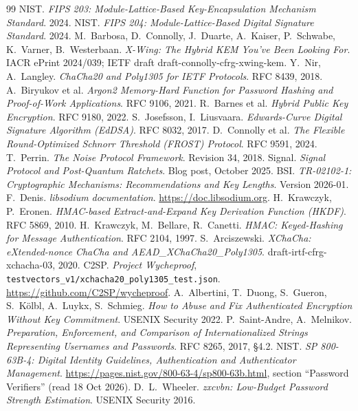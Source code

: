 \documentclass[11pt,a4paper]{article}
\begin{document}
\begin{thebibliography}{99}
 NIST. \emph{FIPS 203: Module-Lattice-Based Key-Encapsulation Mechanism Standard}. 2024.
 NIST. \emph{FIPS 204: Module-Lattice-Based Digital Signature Standard}. 2024.
 M.~Barbosa, D.~Connolly, J.~Duarte, A.~Kaiser, P.~Schwabe, K.~Varner, B.~Westerbaan. \emph{X-Wing: The Hybrid KEM You've Been Looking For}. IACR ePrint 2024/039; IETF draft draft-connolly-cfrg-xwing-kem.
 Y.~Nir, A.~Langley. \emph{ChaCha20 and Poly1305 for IETF Protocols}. RFC 8439, 2018.
 A.~Biryukov et al. \emph{Argon2 Memory-Hard Function for Password Hashing and Proof-of-Work Applications}. RFC 9106, 2021.
 R.~Barnes et al. \emph{Hybrid Public Key Encryption}. RFC 9180, 2022.
 S.~Josefsson, I.~Liusvaara. \emph{Edwards-Curve Digital Signature Algorithm (EdDSA)}. RFC 8032, 2017.
 D.~Connolly et al. \emph{The Flexible Round-Optimized Schnorr Threshold (FROST) Protocol}. RFC 9591, 2024.
 T.~Perrin. \emph{The Noise Protocol Framework}. Revision 34, 2018.
 Signal. \emph{Signal Protocol and Post-Quantum Ratchets}. Blog post, October 2025.
 BSI. \emph{TR-02102-1: Cryptographic Mechanisms: Recommendations and Key Lengths}. Version 2026-01.
 F.~Denis. \emph{libsodium documentation}. \url{https://doc.libsodium.org}.
 H.~Krawczyk, P.~Eronen. \emph{HMAC-based Extract-and-Expand Key Derivation Function (HKDF)}. RFC 5869, 2010.
 H.~Krawczyk, M.~Bellare, R.~Canetti. \emph{HMAC: Keyed-Hashing for Message Authentication}. RFC 2104, 1997.
 S.~Arciszewski. \emph{XChaCha: eXtended-nonce ChaCha and AEAD\_XChaCha20\_Poly1305}. draft-irtf-cfrg-xchacha-03, 2020.
 C2SP. \emph{Project Wycheproof}, \texttt{testvectors\_v1/xchacha20\_poly1305\_test.json}. \url{https://github.com/C2SP/wycheproof}.
 A.~Albertini, T.~Duong, S.~Gueron, S.~Kölbl, A.~Luykx, S.~Schmieg. \emph{How to Abuse and Fix Authenticated Encryption Without Key Commitment}. USENIX Security 2022.
 P.~Saint-Andre, A.~Melnikov. \emph{Preparation, Enforcement, and Comparison of Internationalized Strings Representing Usernames and Passwords}. RFC 8265, 2017, §4.2.
 NIST. \emph{SP 800-63B-4: Digital Identity Guidelines, Authentication and Authenticator Management}. \url{https://pages.nist.gov/800-63-4/sp800-63b.html}, section ``Password Verifiers'' (read 18 Oct 2026).
 D.~L.~Wheeler. \emph{zxcvbn: Low-Budget Password Strength Estimation}. USENIX Security 2016.

\end{thebibliography}
\end{document}
